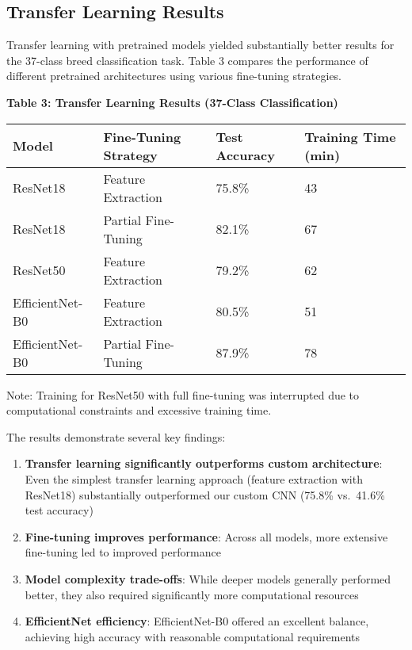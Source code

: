 \documentclass[
]{article}
\providecommand{\tightlist}{%
  \setlength{\itemsep}{0pt}\setlength{\parskip}{0pt}}\usepackage{longtable,booktabs,array}
\begin{document}
\subsection{Transfer Learning Results}\label{transfer-learning-results}

Transfer learning with pretrained models yielded substantially better
results for the 37-class breed classification task. Table 3 compares the
performance of different pretrained architectures using various
fine-tuning strategies.

\textbf{Table 3: Transfer Learning Results (37-Class Classification)}

\begin{longtable}[]{@{}llll@{}}
\toprule\noalign{}
Model & Fine-Tuning Strategy & Test Accuracy & Training Time (min) \\
\midrule\noalign{}
\endhead
\bottomrule\noalign{}
\endlastfoot
ResNet18 & Feature Extraction & 75.8\% & 43 \\
ResNet18 & Partial Fine-Tuning & 82.1\% & 67 \\
ResNet50 & Feature Extraction & 79.2\% & 62 \\
EfficientNet-B0 & Feature Extraction & 80.5\% & 51 \\
EfficientNet-B0 & Partial Fine-Tuning & 87.9\% & 78 \\
\end{longtable}

Note: Training for ResNet50 with full fine-tuning was interrupted due to
computational constraints and excessive training time.

The results demonstrate several key findings:

\begin{enumerate}
\def\labelenumi{\arabic{enumi}.}
\tightlist
\item
  \textbf{Transfer learning significantly outperforms custom
  architecture}: Even the simplest transfer learning approach (feature
  extraction with ResNet18) substantially outperformed our custom CNN
  (75.8\% vs.~41.6\% test accuracy)
\item
  \textbf{Fine-tuning improves performance}: Across all models, more
  extensive fine-tuning led to improved performance
\item
  \textbf{Model complexity trade-offs}: While deeper models generally
  performed better, they also required significantly more computational
  resources
\item
  \textbf{EfficientNet efficiency}: EfficientNet-B0 offered an excellent
  balance, achieving high accuracy with reasonable computational
  requirements
\end{enumerate}
\end{document}
